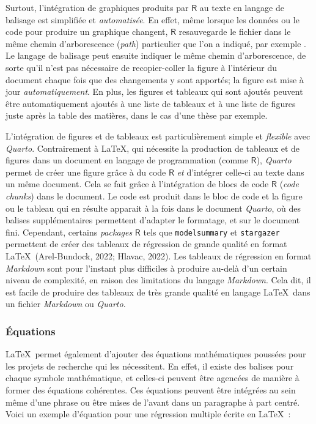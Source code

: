 \documentclass[
  letterpaper,
  DIV=11,
  numbers=noendperiod,
  oneside]{scrreprt}
\begin{document}
Surtout, l'intégration de graphiques produits par \(\textsf{R}\) au
texte en langage de balisage est simplifiée et \emph{automatisée}. En
effet, même lorsque les données ou le code pour produire un graphique
changent, \(\textsf{R}\) resauvegarde le fichier dans le même chemin
d'arborescence (\emph{path}) particulier que l'on a indiqué, par exemple
. Le langage de
balisage peut ensuite indiquer le même chemin d'arborescence, de sorte
qu'il n'est pas nécessaire de recopier-coller la figure à l'intérieur du
document chaque fois que des changements y sont apportés; la figure est
mise à jour \emph{automatiquement}. En plus, les figures et tableaux qui
sont ajoutés peuvent être automatiquement ajoutés à une liste de
tableaux et à une liste de figures juste après la table des matières,
dans le cas d'une thèse par exemple.

L'intégration de figures et de tableaux est particulièrement simple et
\emph{flexible} avec \emph{Quarto}. Contrairement à \LaTeX{}, qui
nécessite la production de tableaux et de figures dans un document en
langage de programmation (comme \(\textsf{R}\)), \emph{Quarto} permet de
créer une figure grâce à du code \(\textsf{R}\) \emph{et} d'intégrer
celle-ci au texte dans un même document. Cela se fait grâce à
l'intégration de blocs de code \(\textsf{R}\) (\emph{code chunks}) dans
le document. Le code est produit dans le bloc de code et la figure ou le
tableau qui en résulte apparait à la fois dans le document
\emph{Quarto}, où des balises supplémentaires permettent d'adapter le
formatage, et sur le document fini. Cependant, certains \emph{packages}
\(\textsf{R}\) tels que \texttt{modelsummary} et \texttt{stargazer}
permettent de créer des tableaux de régression de grande qualité en
format \LaTeX{}~(Arel-Bundock, 2022; Hlavac, 2022). Les tableaux de
régression en format \emph{Markdown} sont pour l'instant plus difficiles
à produire au-delà d'un certain niveau de complexité, en raison des
limitations du langage \emph{Markdown}. Cela dit, il est facile de
produire des tableaux de très grande qualité en langage \LaTeX{}~dans un
fichier \emph{Markdown} ou \emph{Quarto}.

\hypertarget{uxe9quations}{%
\subsubsection{Équations}\label{uxe9quations}}

\LaTeX{}~permet également d'ajouter des équations mathématiques poussées
pour les projets de recherche qui les nécessitent. En effet, il existe
des balises pour chaque symbole mathématique, et celles-ci peuvent être
agencées de manière à former des équations cohérentes. Ces équations
peuvent être intégrées au sein même d'une phrase ou être mises de
l'avant dans un paragraphe à part centré. Voici un exemple d'équation
pour une régression multiple écrite en \LaTeX{}~:
\end{document}
